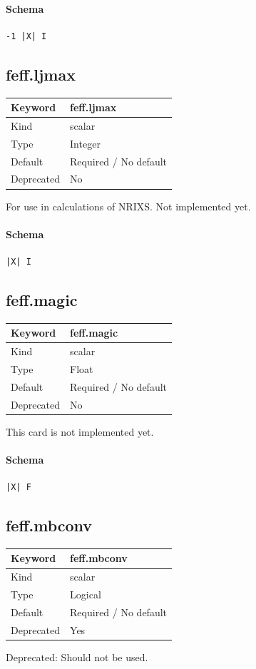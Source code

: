 \documentclass[11pt]{article}
\begin{document}
{{{{\paragraph{Schema}
\begin{Verbatim}
-1 |X| I
\end{Verbatim}

\subsection{feff.ljmax}
\label{kw:feff-ljmax}
\begin{longtable}{|p{1.5in}|p{4.5in}|}
\hline
Keyword & feff.ljmax \\
\hline
Kind & scalar \\
\hline
Type & Integer \\
\hline
Default & Required / No default \\
\hline
Deprecated & No \\
\hline
\end{longtable}
 For use in calculations of NRIXS. Not implemented yet.

\paragraph{Schema}
\begin{Verbatim}
|X| I
\end{Verbatim}

\subsection{feff.magic}
\label{kw:feff-magic}
\begin{longtable}{|p{1.5in}|p{4.5in}|}
\hline
Keyword & feff.magic \\
\hline
Kind & scalar \\
\hline
Type & Float \\
\hline
Default & Required / No default \\
\hline
Deprecated & No \\
\hline
\end{longtable}
 This card is not implemented yet.

\paragraph{Schema}
\begin{Verbatim}
|X| F
\end{Verbatim}

\subsection{feff.mbconv}
\label{kw:feff-mbconv}
\begin{longtable}{|p{1.5in}|p{4.5in}|}
\hline
Keyword & feff.mbconv \\
\hline
Kind & scalar \\
\hline
Type & Logical \\
\hline
Default & Required / No default \\
\hline
Deprecated & Yes \\
\hline
\end{longtable}
 Deprecated: Should not be used.

}}}}
\end{document}
